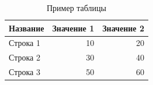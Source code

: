\begin{table}[h!]
    \centering
    \begin{tabular}{lrr}
        \toprule
        \textbf{Название} & \textbf{Значение 1} & \textbf{Значение 2} \\
        \midrule
        Строка 1 & 10 & 20 \\
        Строка 2 & 30 & 40 \\
        Строка 3 & 50 & 60 \\
        \bottomrule
    \end{tabular}
    \caption{Пример таблицы}
    \label{tab:example_table}
\end{table}

\newpage



\nocite{*}






